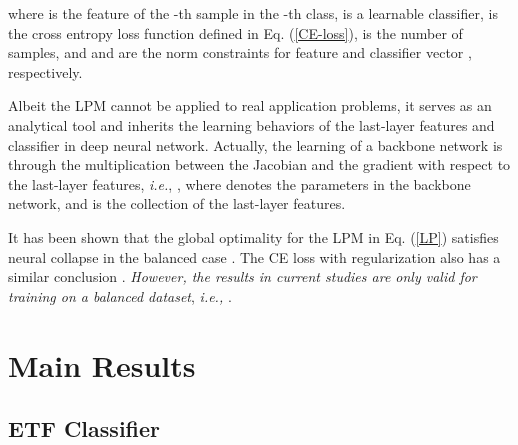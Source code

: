 \documentclass{article}
\newtheorem{theorem}{Theorem}
\newtheorem{proof}{Proof}
\newcommand{\<}{\left\langle}
\renewcommand{\>}{\right\rangle}
\begin{document}
where  is the feature of the -th sample in the -th class,  is a learnable classifier,  is the cross entropy loss function defined in Eq. (\ref{CE-loss}),  is the number of samples, and  and  are the  norm constraints for feature  and classifier vector , respectively. 

Albeit the LPM cannot be applied to real application problems, it serves as an analytical tool and inherits the learning behaviors of the last-layer features and classifier in deep neural network. Actually, the learning of a  backbone network is through the multiplication between the Jacobian and the gradient with respect to the last-layer features, \emph{i.e.}, , where  denotes the parameters in the backbone network, and  is the collection of the last-layer features. 



It has been shown that the global optimality for the LPM in Eq. (\ref{LP}) satisfies neural collapse in the balanced case \cite{fang2021exploring,graf2021dissecting}. The CE loss with regularization also has a similar conclusion \cite{zhu2021geometric}. \emph{However, the results in current studies are only valid for training on a balanced dataset}, \emph{i.e.,} . 
	
	



\iffalse
\begin{theorem}[Layer-peeled model in the balanced case \cite{fang2021exploring,graf2021dissecting}]
	\label{LPM}
	In the balanced case, \emph{i.e.,} , any global minimizer  and  of Eq. (\ref{LP}) obeys to neural collapse, \emph{i.e.,}
	
	where  forms a simplex equiangular tight frame as defined in Eq. (\ref{ETF_M}).
\end{theorem}
\begin{proof} 
	Please refer to \cite{fang2021exploring,graf2021dissecting} for the proof.
	 
\end{proof}
\fi






\section{Main Results}


\subsection{ETF Classifier}
\end{document}
